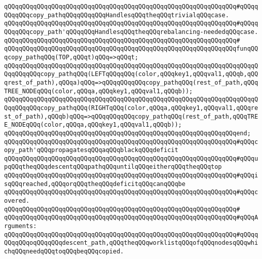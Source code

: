 \verb|qQQqqQQqqQQqqQQqqQQqqQQqqQQqqQQqqQQqqQQqqQQqqQQqqQQqqQQqqQQqqQQq#qQQqqQQqqQQqcopy_pathqQQqqQQqqQQqHandlesqQQqtheqQQqtrivialqQQqcase.|\newline
\verb|qQQqqQQqqQQqqQQqqQQqqQQqqQQqqQQqqQQqqQQqqQQqqQQqqQQqqQQqqQQqqQQq#qQQqqQQqqQQqcopy_path'qQQqqQQqHandlesqQQqtheqQQqrebalancing-neededqQQqcase.|\newline
\verb|qQQqqQQqqQQqqQQqqQQqqQQqqQQqqQQqqQQqqQQqqQQqqQQqqQQqqQQqqQQqqQQq#|\newline
\verb|qQQqqQQqqQQqqQQqqQQqqQQqqQQqqQQqqQQqqQQqqQQqqQQqqQQqqQQqqQQqqQQqfunqQQqcopy_pathqQQq(TOP,qQQqt)qQQq=>qQQqt;|\newline
\verb|qQQqqQQqqQQqqQQqqQQqqQQqqQQqqQQqqQQqqQQqqQQqqQQqqQQqqQQqqQQqqQQqqQQqqQQqqQQqqQQqcopy_pathqQQq(LEFTqQQqqQQq(color,qQQqkey1,qQQqval1,qQQqb,qQQqrest_of_path),qQQqa)qQQq=>qQQqqQQqqQQqcopy_pathqQQq(rest_of_path,qQQqTREE_NODEqQQq(color,qQQqa,qQQqkey1,qQQqval1,qQQqb));|\newline
\verb|qQQqqQQqqQQqqQQqqQQqqQQqqQQqqQQqqQQqqQQqqQQqqQQqqQQqqQQqqQQqqQQqqQQqqQQqqQQqqQQqcopy_pathqQQq(RIGHTqQQq(color,qQQqa,qQQqkey1,qQQqval1,qQQqrest_of_path),qQQqb)qQQq=>qQQqqQQqqQQqcopy_pathqQQq(rest_of_path,qQQqTREE_NODEqQQq(color,qQQqa,qQQqkey1,qQQqval1,qQQqb));|\newline
\verb|qQQqqQQqqQQqqQQqqQQqqQQqqQQqqQQqqQQqqQQqqQQqqQQqqQQqqQQqqQQqqQQqend;|\newline
\newline
\newline
\verb|qQQqqQQqqQQqqQQqqQQqqQQqqQQqqQQqqQQqqQQqqQQqqQQqqQQqqQQqqQQqqQQq#qQQqcopy_path'qQQqpropagatesqQQqaqQQqblackqQQqdeficit|\newline
\verb|qQQqqQQqqQQqqQQqqQQqqQQqqQQqqQQqqQQqqQQqqQQqqQQqqQQqqQQqqQQqqQQq#qQQqupqQQqtheqQQqdescentqQQqpathqQQquntilqQQqeitherqQQqtheqQQqtop|\newline
\verb|qQQqqQQqqQQqqQQqqQQqqQQqqQQqqQQqqQQqqQQqqQQqqQQqqQQqqQQqqQQqqQQq#qQQqisqQQqreached,qQQqorqQQqtheqQQqdeficitqQQqcanqQQqbe|\newline
\verb|qQQqqQQqqQQqqQQqqQQqqQQqqQQqqQQqqQQqqQQqqQQqqQQqqQQqqQQqqQQqqQQq#qQQqcovered.|\newline
\verb|qQQqqQQqqQQqqQQqqQQqqQQqqQQqqQQqqQQqqQQqqQQqqQQqqQQqqQQqqQQqqQQq#|\newline
\verb|qQQqqQQqqQQqqQQqqQQqqQQqqQQqqQQqqQQqqQQqqQQqqQQqqQQqqQQqqQQqqQQq#qQQqArguments:|\newline
\verb|qQQqqQQqqQQqqQQqqQQqqQQqqQQqqQQqqQQqqQQqqQQqqQQqqQQqqQQqqQQqqQQq#qQQqqQQqqQQqoqQQqqQQqdescent_path,qQQqtheqQQqworklistqQQqofqQQqnodesqQQqwhichqQQqneedqQQqtoqQQqbeqQQqcopied.|\newline
